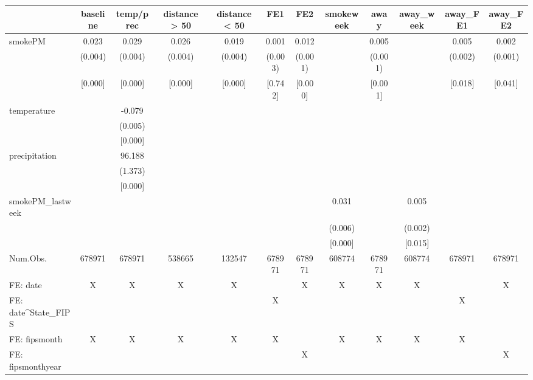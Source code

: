 \begin{table}
\centering
\begin{tabular}[t]{lccccccccccc}
\toprule
  & baseline & temp/prec & distance > 50 & distance < 50 & FE1 & FE2 & smokeweek & away & away\_week & away\_FE1 & away\_FE2\\
\midrule
smokePM & 0.023 & 0.029 & 0.026 & 0.019 & 0.001 & 0.012 &  & 0.005 &  & 0.005 & 0.002\\
 & (0.004) & (0.004) & (0.004) & (0.004) & (0.003) & (0.001) &  & (0.001) &  & (0.002) & (0.001)\\
 & {}[0.000] & {}[0.000] & {}[0.000] & {}[0.000] & {}[0.742] & {}[0.000] &  & {}[0.001] &  & {}[0.018] & {}[0.041]\\
temperature &  & -0.079 &  &  &  &  &  &  &  &  & \\
 &  & (0.005) &  &  &  &  &  &  &  &  & \\
 &  & {}[0.000] &  &  &  &  &  &  &  &  \vphantom{1} & \\
precipitation &  & 96.188 &  &  &  &  &  &  &  &  & \\
 &  & (1.373) &  &  &  &  &  &  &  &  & \\
 &  & {}[0.000] &  &  &  &  &  &  &  &  & \\
smokePM\_lastweek &  &  &  &  &  &  & 0.031 &  & 0.005 &  & \\
 &  &  &  &  &  &  & (0.006) &  & (0.002) &  & \\
 &  &  &  &  &  &  & {}[0.000] &  & {}[0.015] &  & \\
\midrule
Num.Obs. & 678971 & 678971 & 538665 & 132547 & 678971 & 678971 & 608774 & 678971 & 608774 & 678971 & 678971\\
FE: date & X & X & X & X &  & X & X & X & X &  & X\\
FE: date^State_FIPS &  &  &  &  & X &  &  &  &  & X & \\
FE: fipsmonth & X & X & X & X & X &  & X & X & X & X & \\
FE: fipsmonthyear &  &  &  &  &  & X &  &  &  &  & X\\
\bottomrule
\end{tabular}
\end{table}
